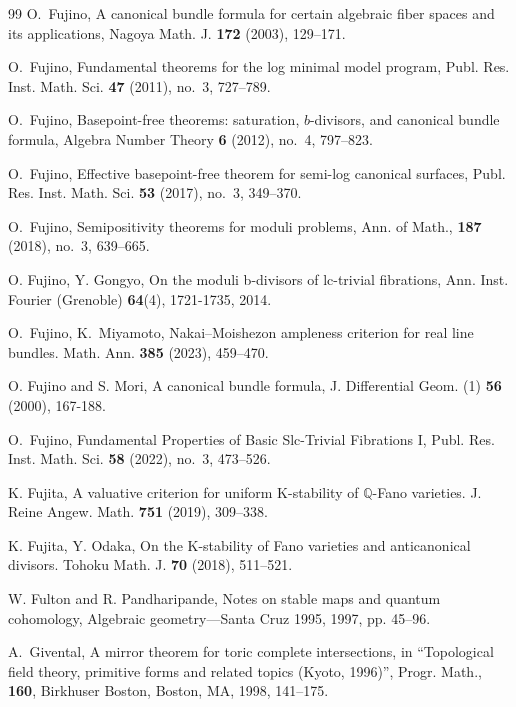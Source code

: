 \documentclass[12pt,twoside]{amsart}
\theoremstyle{definition}
\begin{document}
\begin{thebibliography}{99}
 O.~Fujino, A canonical bundle formula for certain algebraic fiber spaces and its applications, Nagoya Math. J. {\bf172} (2003), 129--171.


O.~Fujino, Fundamental theorems for the log minimal model program, Publ. Res. Inst. Math. Sci. {\textbf{47}} (2011), no.~3, 727--789.  

 O.~Fujino, Basepoint-free theorems: saturation, $b$-divisors, and canonical bundle formula, Algebra Number Theory {\textbf{6}} (2012), no.~4, 797--823.

 O.~Fujino, Effective basepoint-free theorem for semi-log canonical surfaces, Publ. Res. Inst. Math. Sci. {\textbf{53}} (2017), no.~3, 349--370. 

 O.~Fujino, Semipositivity theorems for moduli problems, Ann. of Math., {\textbf{187}} (2018), no.~3, 639--665.

 O. Fujino, Y. Gongyo, On the moduli b-divisors of lc-trivial fibrations, Ann. Inst. Fourier (Grenoble) {\bf64}(4), 1721-1735, 2014.

 O.~Fujino, K.~Miyamoto, Nakai--Moishezon ampleness criterion for real line bundles. Math. Ann. {\bf385} (2023), 459–470. 

 O. Fujino and S. Mori, A canonical bundle formula, J. Differential Geom. (1) {\bf 56} (2000), 167-188.


O.~Fujino, Fundamental Properties of Basic Slc-Trivial Fibrations I, Publ. Res. Inst. Math. Sci. {\textbf{58}} (2022), no.~3, 473--526. 


 K. Fujita, A valuative criterion for uniform K-stability of $\mathbb{Q}$-Fano varieties. J. Reine Angew. Math. {\bf751} (2019), 309--338.


 K. Fujita, Y. Odaka, On the K-stability of Fano varieties and anticanonical divisors. Tohoku Math. J. {\bf70} (2018), 511--521.

 W. Fulton and R. Pandharipande, Notes on stable maps and quantum cohomology, Algebraic geometry—Santa
Cruz 1995, 1997, pp. 45–96.



 A.~Givental, A mirror theorem for toric complete intersections, in “Topological
field theory, primitive forms and related topics (Kyoto, 1996)”, Progr. Math.,
{\bf160}, Birkhuser Boston, Boston, MA, 1998, 141–175.


\end{thebibliography}
\end{document}
